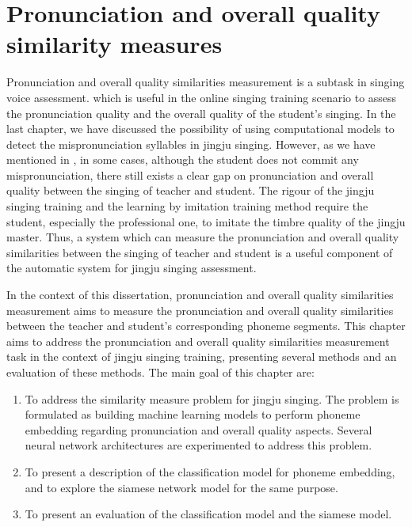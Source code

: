 \chapter{Pronunciation and overall quality similarity measures}\label{chap:similarity_pronunciation}

Pronunciation and overall quality similarities measurement is a subtask in singing voice assessment. which is useful in the online singing training scenario to assess the pronunciation quality and the overall quality of the student's singing. In the last chapter, we have discussed the possibility of using computational models to detect the mispronunciation syllables in jingju singing. However, as we have mentioned in , in some cases, although the student does not commit any mispronunciation, there still exists a clear gap on pronunciation and overall quality between the singing of teacher and student. The rigour of the jingju singing training and the learning by imitation training method require the student, especially the professional one, to imitate the timbre quality of the jingju master. Thus, a system which can measure the pronunciation and overall quality similarities between the singing of teacher and student is a useful component of the automatic system for jingju singing assessment.

In the context of this dissertation, pronunciation and overall quality similarities measurement aims to measure the pronunciation and overall quality similarities between the teacher and student's corresponding phoneme segments. This chapter aims to address the pronunciation and overall quality similarities measurement task in the context of jingju singing training, presenting several methods and an evaluation of these methods. The main goal of this chapter are:

\begin{enumerate}[leftmargin=*]
\item To address the similarity measure problem for jingju singing. The problem is formulated as building machine learning models to perform phoneme embedding regarding pronunciation and overall quality aspects. Several neural network architectures are experimented to address this problem.

\item To present a description of the classification model for phoneme embedding, and to explore the siamese network model for the same purpose.

\item To present an evaluation of the classification model and the siamese model.
\end{enumerate}


